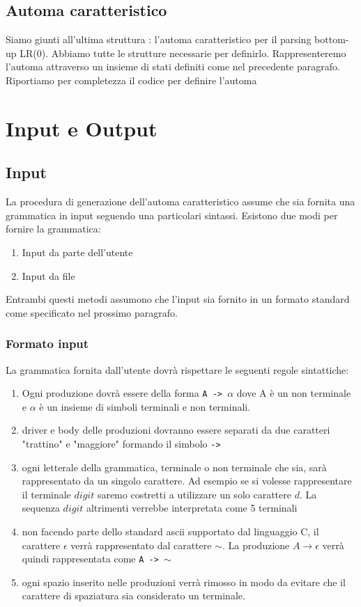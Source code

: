 \documentclass[12pt]{article}
\begin{document}
\subsection{Automa caratteristico}
Siamo giunti all'ultima struttura : l'automa caratteristico per il parsing bottom-up LR(0). Abbiamo tutte le strutture necessarie per definirlo. Rappresenteremo l'automa attraverso un insieme di stati definiti come nel precedente paragrafo.\\

Riportiamo per completezza il codice per definire l'automa


\section{Input e Output}

\subsection{Input}
La procedura di generazione dell'automa caratteristico assume che sia fornita una grammatica in input seguendo una particolari sintassi. Esistono due modi per fornire la grammatica:
\begin{enumerate}
\item Input da parte dell'utente
\item Input da file
\end{enumerate}

Entrambi questi metodi assumono che l'input sia fornito in un formato standard come specificato nel prossimo paragrafo.

\subsubsection{Formato input}\label{sec:inputformat}
La grammatica fornita dall'utente dovrà rispettare le seguenti regole sintattiche:
\begin{enumerate}
\item Ogni produzione dovrà essere della forma \texttt{A -> $\alpha$} dove A è un non terminale e $\alpha$ è un insieme di simboli terminali e non terminali. 
\item driver e body delle produzioni dovranno essere separati da due caratteri "trattino" e "maggiore" formando il simbolo \texttt{->} 
\item ogni letterale della grammatica, terminale o non terminale che sia, sarà rappresentato da un singolo carattere. Ad esempio se si volesse rappresentare il terminale $digit$ saremo costretti a utilizzare un solo carattere $d$. La sequenza $digit$ altrimenti verrebbe interpretata come 5 terminali
\item non facendo parte dello standard ascii supportato dal linguaggio C, il carattere $\epsilon$ verrà rappresentato dal carattere $\sim$.
La produzione $A \to \epsilon$ verrà quindi rappresentata come \texttt{A -> $\sim$}
\item ogni spazio inserito nelle produzioni verrà rimosso in modo da evitare che il carattere di spaziatura sia considerato un terminale.

\end{enumerate} 
\end{document}
